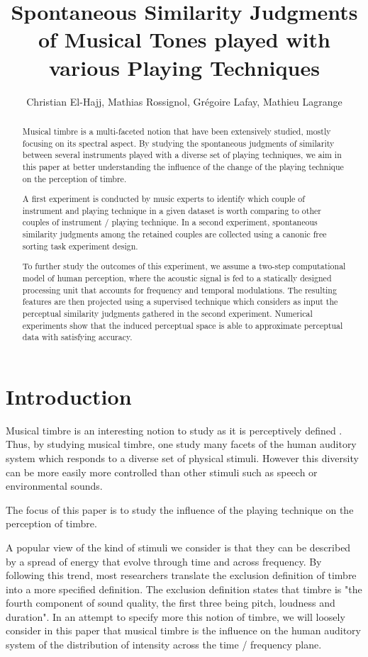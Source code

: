 \documentclass{article}
\title{Spontaneous Similarity Judgments of Musical Tones played with various Playing Techniques}
\author{Christian El-Hajj, Mathias Rossignol, Grégoire Lafay, Mathieu Lagrange}
\begin{document}
%
\maketitle
%
\begin{abstract}

Musical timbre is a multi-faceted notion that have been extensively studied, mostly focusing on its spectral aspect. By studying the spontaneous judgments of similarity between several instruments played with a diverse set of playing techniques, we aim in this paper at better understanding the influence of the change of the playing technique on the perception of timbre.

A first experiment is conducted by music experts to identify which couple of instrument and playing technique in a given dataset is worth comparing to other couples of instrument / playing technique. In a second experiment, spontaneous similarity judgments among the retained couples are collected using a canonic free sorting task experiment design.


To further study the outcomes of this experiment, we assume a two-step computational model of human perception, where the acoustic signal is fed to a statically designed processing unit that accounts for frequency and temporal modulations. The resulting features are then projected using a supervised technique which considers as input the perceptual similarity judgments gathered in the second experiment. Numerical experiments show that the induced perceptual space is able to approximate perceptual data with satisfying accuracy.

\end{abstract}
%
\section{Introduction}\label{sec:introduction}

Musical timbre is an interesting notion to study as it is perceptively defined \cite{grey1977multidimensional}. Thus, by studying musical timbre, one study many facets of the human auditory system which responds to a diverse set of physical stimuli. However this diversity can be more easily more controlled than other stimuli such as speech or environmental sounds.

The focus of this paper is to study the influence of the playing technique on the perception of timbre.

A popular view of the kind of stimuli we consider is that they can be described by a spread of energy that evolve through time and across frequency. By following this trend, most researchers translate the exclusion definition of timbre \cite{marozeau2003dependency} into a more specified definition. The exclusion definition states that timbre is "the fourth component of sound quality, the first three being pitch, loudness and duration". In an attempt to specify more this notion of timbre, we will loosely consider in this paper that musical timbre is the influence on the human auditory system of the distribution of intensity across the time / frequency plane.
\end{document}
